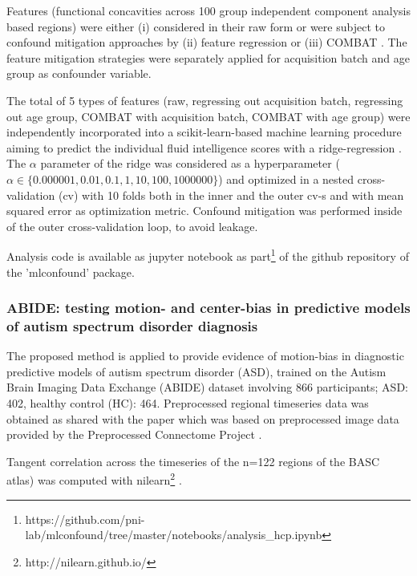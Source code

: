 \documentclass{article}
\begin{document}
Features (functional concavities across 100 group independent component analysis based regions) were either (i) considered in their raw form or were subject to confound mitigation approaches by (ii) feature regression \citep{rao2017predictive} or (iii) COMBAT \citep{johnson2007adjusting, fortin2018harmonization}.
The feature mitigation strategies were separately applied for acquisition batch and age group as confounder variable.

The total of 5 types of features (raw, regressing out acquisition batch, regressing out age group, COMBAT with acquisition batch, COMBAT with age group) were independently incorporated into a scikit-learn-based \citep{pedregosa2011scikit} machine learning procedure aiming to predict the individual fluid intelligence scores with a ridge-regression \citep{hoerl1970ridge}. The $\alpha$ parameter of the ridge was considered as a hyperparameter ($\alpha \in \{0.000001, 0.01, 0.1, 1, 10, 100, 1000000\}$) and optimized in a nested cross-validation (cv) with 10 folds both in the inner and the outer cv-s and with mean squared error as optimization metric. Confound mitigation was performed inside of the outer cross-validation loop, to avoid leakage.

Analysis code is available as jupyter notebook as part\footnote{https://github.com/pni-lab/mlconfound/tree/master/notebooks/analysis\_hcp.ipynb} of the github repository of the 'mlconfound' package.


\subsubsection*{ABIDE: testing motion- and center-bias in predictive models of autism spectrum disorder diagnosis}

The proposed method is applied to provide evidence of motion-bias in diagnostic predictive models of autism spectrum disorder (ASD), trained on the Autism Brain Imaging Data Exchange (ABIDE) dataset \citep{di2014autism} involving 866 participants; ASD: 402, healthy control (HC): 464. Preprocessed regional timeseries data was obtained as shared with the paper \citep{dadi2019benchmarking} which was based on preprocessed image data provided by the Preprocessed Connectome Project \citep{craddock2013neuro}.

Tangent correlation across the timeseries of the n=122 regions of the BASC \citep{bellec2010multi} atlas) was computed with nilearn\footnote{http://nilearn.github.io/} \citep{huntenburg2017loading, esteve2015big}. 
\end{document}
